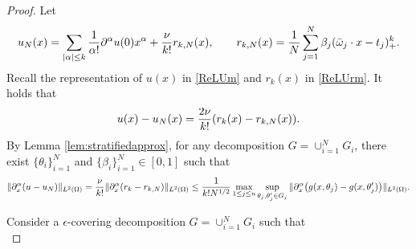 \begin{proof}
Let
$$
u_N(x)=  \sum_{|\alpha|\le k}{1\over \alpha!} \partial^\alpha u(0) x^\alpha + {\nu\over k!} r_{k,N}(x), \qquad r_{k,N}(x)={1\over N}\sum_{j=1}^{N}\beta_j (\bar \omega_j\cdot x - t_j)_+^k.
$$
Recall  the representation  of $u(x)$ in \eqref{ReLUm} and $r_k(x)$ in \eqref{ReLUrm}. It holds that
\begin{equation}
u(x) - u_N(x)={2\nu\over k!} (r_k(x) - r_{k,N}(x)).
\end{equation}
By Lemma \ref{lem:stratifiedapprox}, for any decomposition $\displaystyle G=\cup_{i=1}^N G_i$, there exist $\{\theta_i\}_{i=1}^N$ and $\{\beta_i\}_{i=1}^N\in [0, 1]$ such that 
\begin{equation}
\| \partial_x^\alpha (u - u_N)\|_{L^2(\Omega)} = {\nu\over k!}\|  \partial_x^\alpha (r_k - r_{k,N})\|_{L^2(\Omega)} \leq {1\over k!N^{1/2}}\max_{1\le j\le n}\sup_{\theta_{j},\theta_{j}'\in G_j} \|  \partial_x^\alpha \big(g(x,\theta_j) - g(x,\theta_j')\big)\|_{L^2(\Omega)}.
\end{equation}
\iffalse
Consider a $\epsilon$-covering decomposition $G=\cup_{i=1}^M G_i$ as follows. 
The variable $z$ is in the set $\{-1,1\}$, which can be divided into two subsets $\{-1\}$ and $\{1\}$. 
Given a positive integer $N$, for the random variable $t$, the interval  $ [0,T]$ can be divided into $n_t$ subintervals $\{G_i^t\}_{i=1}^{n_t}$ such that 
$$
|t-t'|<{1\over 2}N^{-{1\over d}}\quad t,t'\in G_i^t,\quad 1\leq i\leq n_t
$$ 
for $n_t>2\lceil T N^{1\over d}\rceil$. 
For variable $\bar \omega=\omega/\|\omega\|\in \mathbb{S}^{d-1}$ where $\mathbb{S}^{d-1}=\{\bar \omega\in \mathbb{R}^d: \|\bar \omega\|=1\}$. Note that $\mathbb{S}^{d-1}$ can be divided into $n_\alpha$ subdomains $\{G_i^s \}_{i=1}^{n_s}$ such that
$$
\|\bar \omega- \bar \omega'\|\leq {1\over 2}N^{-{1\over d}}\qquad \bar \omega, \bar \omega' \in G_i^s,\quad 1\leq i\leq n_s
$$
for $(2N^{1\over d})^{d-1}\leq n_s\leq \lceil (5N^{1\over d})^{d-1}\rceil$ \cite{klusowski2016uniform}.
Then 
$$
G=\displaystyle \cup \{G_{ijk\ell}: 1\leq i\leq 2,\ 1\leq j\leq n_t,\ 1\leq k\leq n_s,\ 1\le \ell\le 2\}
$$
with 
\begin{equation}
G_{ijk\ell} = \{(z, t, \omega): z=(-1)^i,\ t\in G_j^t, \bar \omega \in G_k^s,\ {\rm sgn} s(zt,\omega)=(-1)^\ell\}.
\end{equation}
Denote this decomposition of $G$ by $G=\cup_{i=1}^{M} G_i$ with $M=4n_sn_t\le 2^{d}N$. For each $G_i$,
\fi
Consider a $\epsilon$-covering decomposition $G=\cup_{i=1}^N G_i$  such that 
\begin{equation}

\end{equation}
\end{proof}
